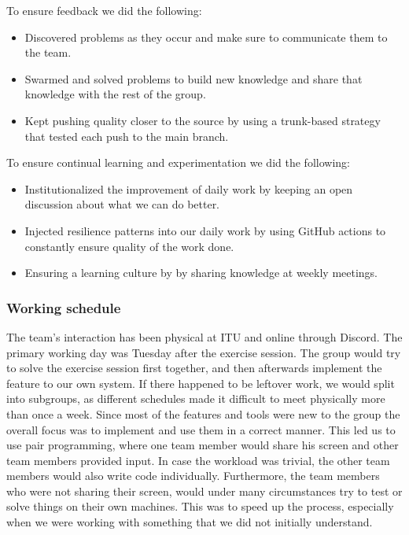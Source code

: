 \noindent To ensure feedback we did the following:
\begin{itemize}
    \item Discovered problems as they occur and make sure to communicate them to the team.
    \item Swarmed and solved problems to build new knowledge and share that knowledge with the rest of the group.
    \item Kept pushing quality closer to the source by using a trunk-based strategy that tested each push to the main branch.
\end{itemize}

\noindent To ensure continual learning and experimentation we did the following:
\begin{itemize}
    \item Institutionalized the improvement of daily work by keeping an open discussion about what we can do better.
    \item Injected resilience patterns into our daily work by using GitHub actions to constantly ensure quality of the work done.
    \item Ensuring a learning culture by by sharing knowledge at weekly meetings.
\end{itemize}

\subsubsection{Working schedule}
The team's interaction has been physical at ITU and online through Discord. The primary working day was Tuesday after the exercise session. The group would try to solve the exercise session first together, and then afterwards implement the feature to our own system. If there happened to be leftover work, we would split into subgroups, as different schedules made it difficult to meet physically more than once a week. Since most of the features and tools were new to the group the overall focus was to implement and use them in a correct manner. This led us to use pair programming, where one team member would share his screen and other team members provided input. In case the workload was trivial, the other team members would also write code individually. Furthermore, the team members who were not sharing their screen, would under many circumstances try to test or solve things on their own machines. This was to speed up the process, especially when we were working with something that we did not initially understand. \\

